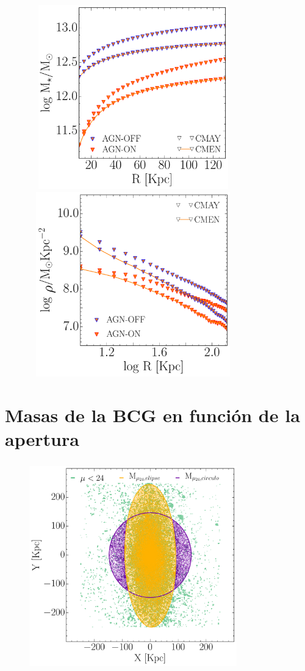 \begin{figure}[H]
 \centering
 \includegraphics[height=8cm, width=9cm]{../al_final/LR/evolucion/relaciones/csf_agn_acumuladas.pdf}
 \includegraphics[height=8cm, width=9cm]{../al_final/LR/evolucion/relaciones/csf_agn_perfil_dens_masa_con_log.pdf}
\end{figure}


\section{Masas de la BCG en funci\'on de la apertura}

\begin{figure}[H]
 \centering
 \includegraphics[height=9cm, width=9cm]{../al_final/plots/elipses/D22elipse-circ.pdf}
\end{figure}

